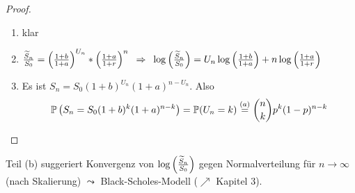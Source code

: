 \begin{proof}
	\begin{enumerate}[label=(zu \alph*), leftmargin=*]
		\item klar
		\item $\frac{\widetilde{S}_n}{S_0} = \left( \frac{1+b}{1+a} \right)^{U_n} * \left( \frac{1+a}{1+r} \right)^n \enskip \Rightarrow \enskip \log\left( \frac{\widetilde{S}_n}{S_0} \right) = U_n \log\left( \frac{1+b}{1+a} \right) + n \log\left( \frac{1+a}{1+r} \right)$
		\item Es ist $S_n = S_0 (1+b)^{U_n}(1+a)^{n-U_n} $. Also
		\begin{equation*}
			\mathbb{P}\left( S_n = S_0 (1+b)^k (1+a)^{n-k} \right) = \mathbb{P}(U_n = k) \overset{(a)}{=} \binom{n}{k} p^k (1-p)^{n-k}
		\end{equation*}
	\end{enumerate}
\end{proof}

\begin{*bemerkung}
	Teil (b) suggeriert Konvergenz von $\log\left( \frac{\widetilde{S}_n}{S_0} \right)$ gegen Normalverteilung für $n \to \infty$ (nach Skalierung) 
	$\leadsto$ Black-Scholes-Modell ($\nearrow$ Kapitel 3).
\end{*bemerkung}